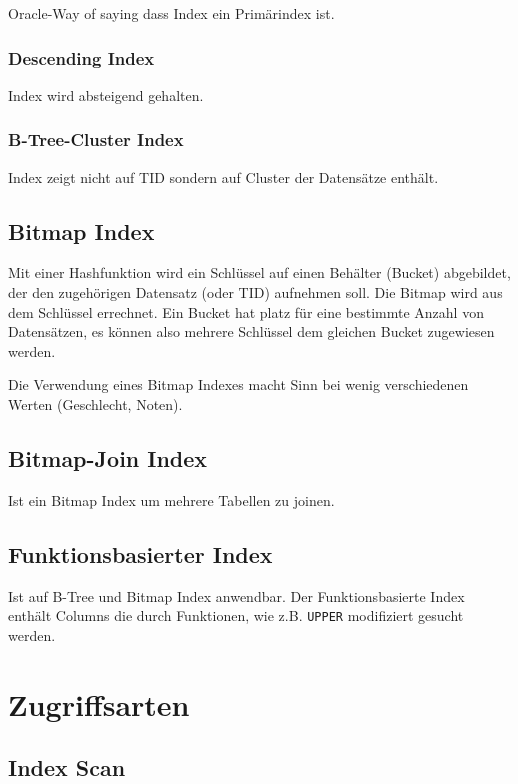 Oracle-Way of saying dass Index ein Primärindex ist.

\subsubsection{Descending Index}

Index wird absteigend gehalten.

\subsubsection{B-Tree-Cluster Index}

Index zeigt nicht auf TID sondern auf Cluster der Datensätze enthält.

\subsection{Bitmap Index}

Mit einer Hashfunktion wird ein Schlüssel auf einen Behälter (Bucket) abgebildet, der den zugehörigen Datensatz (oder TID) aufnehmen soll. Die Bitmap wird aus dem Schlüssel errechnet. Ein Bucket hat platz für eine bestimmte Anzahl von Datensätzen, es können also mehrere Schlüssel dem gleichen Bucket zugewiesen werden.

Die Verwendung eines Bitmap Indexes macht Sinn bei wenig verschiedenen Werten (Geschlecht, Noten).

\subsection{Bitmap-Join Index}

Ist ein Bitmap Index um mehrere Tabellen zu joinen.

\subsection{Funktionsbasierter Index}

Ist auf B-Tree und Bitmap Index anwendbar.
Der Funktionsbasierte Index enthält Columns die durch Funktionen, wie z.B. \lstinline{UPPER} modifiziert gesucht werden.

\section{Zugriffsarten}

\subsection{Index Scan}

